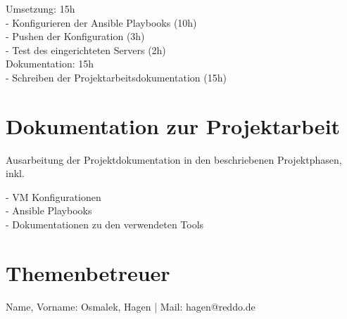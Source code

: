 \documentclass[11pt]{article}
\begin{document}
Umsetzung: 15h\\
- Konfigurieren der Ansible Playbooks (10h)\\
- Pushen der Konfiguration (3h)\\
- Test des eingerichteten Servers (2h)\\

Dokumentation: 15h\\
- Schreiben der Projektarbeitsdokumentation (15h)\\

\section{Dokumentation zur Projektarbeit}
Ausarbeitung der Projektdokumentation in den beschriebenen Projektphasen, inkl.

- VM Konfigurationen\\
- Ansible Playbooks\\
- Dokumentationen zu den verwendeten Tools\\

\section{Themenbetreuer}
Name, Vorname: Osmalek, Hagen | Mail: hagen@reddo.de
\end{document}
